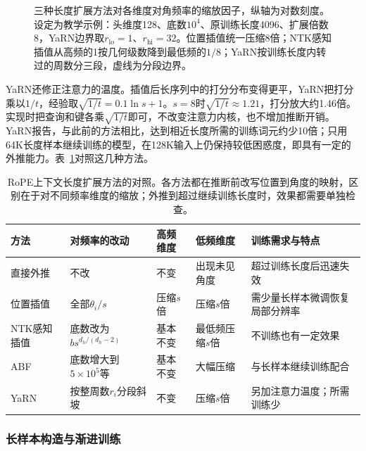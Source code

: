 \begin{figure}[htbp]
  \centering
  
  \caption{三种长度扩展方法对各维度对角频率的缩放因子，纵轴为对数刻度。设定为教学示例：头维度128、底数$10^4$、原训练长度4096、扩展倍数8，YaRN边界取$r_{\mathrm{lo}}=1$、$r_{\mathrm{hi}}=32$。位置插值统一压缩8倍；NTK感知插值从高频的1按几何级数降到最低频的$1/8$；YaRN按训练长度内转过的周数分三段，虚线为分段边界。}
  \label{fig:nlp-llm-rope-scaling}
\end{figure}

YaRN还修正注意力的温度。插值后长序列中的打分分布变得更平，YaRN把打分乘以$1/t$，经验取$\sqrt{1/t}=0.1\ln s+1$。$s=8$时$\sqrt{1/t}\approx1.21$，打分放大约1.46倍。实现时把查询和键各乘$\sqrt{1/t}$即可，不改变注意力内核，也不增加推断开销。YaRN报告，与此前的方法相比，达到相近长度所需的训练词元约少10倍；只用64K长度样本继续训练的模型，在128K输入上仍保持较低困惑度，即具有一定的外推能力。表~\ref{tab:nlp-llm-context-extension}对照这几种方法。

\begin{table}[!b]
 \small
 \begin{tabularx}{\linewidth}{@{}p{24mm}p{40mm}p{30mm}p{28mm}X@{}}
  \toprule
  方法 & 对频率的改动 & 高频维度 & 低频维度 & 训练需求与特点\\
  \midrule
  直接外推 & 不改 & 不变 & 出现未见角度 & 超过训练长度后迅速失效\\
  位置插值 & 全部$\theta_i/s$ & 压缩$s$倍 & 压缩$s$倍 & 需少量长样本微调恢复局部分辨率\\
  NTK感知插值 & 底数改为$b s^{d_h/(d_h-2)}$ & 基本不变 & 最低频压缩$s$倍 & 不训练也有一定效果\\
  ABF & 底数增大到$5\times10^5$等 & 基本不变 & 大幅压缩 & 与长样本继续训练配合\\
  YaRN & 按整周数$r_i$分段斜坡 & 不变 & 压缩$s$倍 & 另加注意力温度；所需训练少\\
  \bottomrule
 \end{tabularx}
 \caption{RoPE上下文长度扩展方法的对照。各方法都在推断前改写位置到角度的映射，区别在于对不同频率维度的缩放；外推到超过继续训练长度时，效果都需要单独检查。}
 \label{tab:nlp-llm-context-extension}
\end{table}

\subsubsection{长样本构造与渐进训练}
\label{sec:nlp-llm-long-data}

